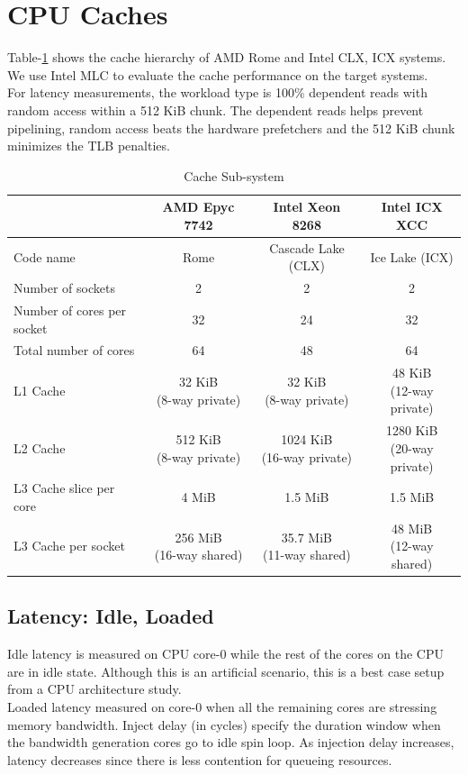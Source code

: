 \documentclass{article}
\begin{document}
\section{CPU Caches}
Table-\ref{table:cache_subsystem} shows the cache hierarchy of AMD Rome and Intel CLX, ICX systems. We use Intel MLC to evaluate the cache performance on the target systems.\\
For latency measurements, the workload type is 100\% dependent reads with random access within a 512 KiB chunk. The dependent reads helps prevent pipelining, random access beats the hardware prefetchers and the 512 KiB chunk minimizes the TLB penalties.
\begin{table}[h!]
\centering
 \begin{tabular}{|l|c|c|c|} \hline
& AMD Epyc 7742 & Intel Xeon 8268 & Intel ICX XCC \\\hline
Code name & Rome & Cascade Lake (CLX) & Ice Lake (ICX) \\ \hline
Number of sockets & 2 & 2 & 2 \\ \hline
Number of cores per socket & 32 & 24 & 32 \\ \hline
Total number of cores & 64 & 48 & 64 \\ \hline
L1 Cache & \makecell{32 KiB\\(8-way private)} & \makecell{32 KiB\\(8-way private)} & \makecell{48 KiB\\(12-way private)}\\ \hline
L2 Cache & \makecell{512 KiB\\(8-way private)} & \makecell{1024 KiB\\(16-way private)} & \makecell{1280 KiB\\(20-way private)} \\ \hline
L3 Cache slice per core & 4 MiB & 1.5 MiB & 1.5 MiB \\ \hline
L3 Cache per socket & \makecell{256 MiB\\(16-way shared)} & \makecell{35.7 MiB\\(11-way shared)} & \makecell{48 MiB\\(12-way shared)}\\ \hline
\end{tabular}
\caption{Cache Sub-system}
\label{table:cache_subsystem}
\end{table}


\subsection{Latency: Idle, Loaded}
Idle latency is measured on CPU core-0 while the rest of the cores on the CPU are in idle state. Although this is an artificial scenario, this is a best case setup from a CPU architecture study. \\
Loaded latency measured on core-0 when all the remaining cores are stressing memory bandwidth. Inject delay (in cycles) specify the duration window when the bandwidth generation cores go to idle spin loop. As injection delay increases, latency decreases since there is less contention for queueing resources. 
\end{document}
